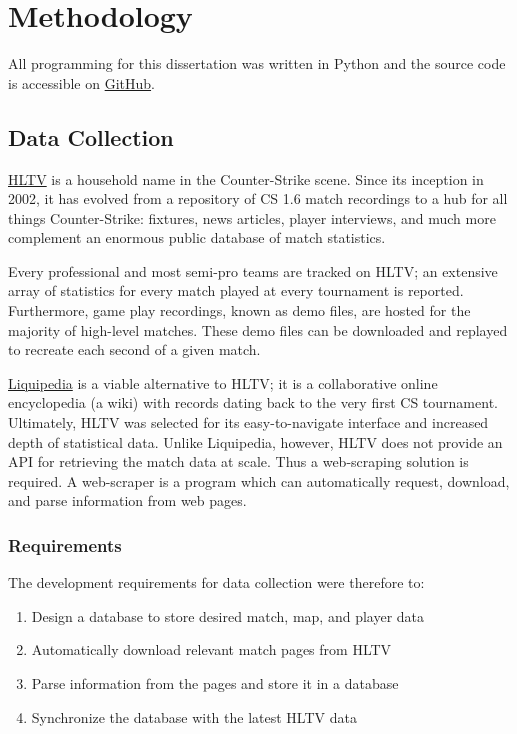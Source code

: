 \chapter{Methodology}
\label{Methodology}


All programming for this dissertation was written in Python \cite{python} and the source code is accessible on \href{https://github.com/zakdux/counter-strike}{GitHub}.

\section{Data Collection}

\href{https://www.hltv.org/}{HLTV} is a household name in the Counter-Strike scene. Since its inception in 2002, it has evolved from a repository of CS 1.6 match recordings to a hub for all things Counter-Strike: fixtures, news articles, player interviews, and much more complement an enormous public database of match statistics. 

Every professional and most semi-pro teams are tracked on HLTV; an extensive array of statistics for every match played at every tournament is reported. Furthermore, game play recordings, known as demo files, are hosted for the majority of high-level matches. These demo files can be downloaded and replayed to recreate each second of a given match.

\href{https://liquipedia.net/counterstrike/}{Liquipedia} is a viable alternative to HLTV; it is a collaborative online encyclopedia (a wiki) with records dating back to the very first CS tournament. Ultimately, HLTV was selected for its easy-to-navigate interface and increased depth of statistical data. Unlike Liquipedia, however, HLTV does not provide an API for retrieving the match data at scale. Thus a web-scraping solution is required. A web-scraper is a program which can automatically request, download, and parse information from web pages.

\subsection{Requirements}

The development requirements for data collection were therefore to:

\begin{enumerate}
\item{Design a database to store desired match, map, and player data}
\item{Automatically download relevant match pages from HLTV}
\item{Parse information from the pages and store it in a database}
\item{Synchronize the database with the latest HLTV data}
\end{enumerate}

